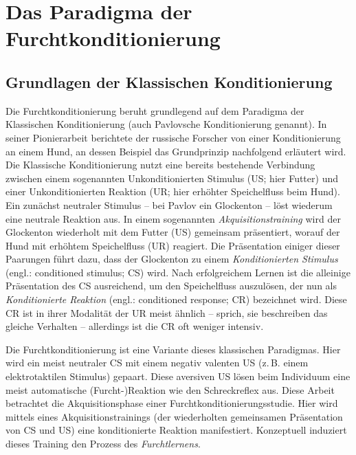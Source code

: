 
\section{Das Paradigma der Furchtkonditionierung}	\label{fearcondi}

	\subsection{Grundlagen der Klassischen Konditionierung}	\label{classic}

		Die Furchtkonditionierung beruht grundlegend auf dem Paradigma der Klassischen Konditionierung (auch Pavlovsche Konditionierung genannt). In seiner Pionierarbeit berichtete der russische Forscher \textcite{PAVLOV1927} von einer Konditionierung an einem Hund, an dessen Beispiel das Grundprinzip nachfolgend erläutert wird. 
		Die Klassische Konditionierung nutzt eine bereits bestehende Verbindung zwischen einem sogenannten Unkonditionierten Stimulus (US; hier Futter) und einer Unkonditionierten Reaktion (UR; hier erhöhter Speichelfluss beim Hund). Ein zunächst neutraler Stimulus -- bei Pavlov ein Glockenton -- löst wiederum eine neutrale Reaktion aus. In einem sogenannten \textit{Akquisitionstraining} wird der Glockenton wiederholt mit dem Futter (US) gemeinsam präsentiert, worauf der Hund mit erhöhtem Speichelfluss (UR) reagiert. Die Präsentation einiger dieser Paarungen führt dazu, dass der Glockenton zu einem \textit{Konditionierten Stimulus} (engl.: conditioned stimulus; CS) wird. Nach erfolgreichem Lernen ist die alleinige Präsentation des CS ausreichend, um den Speichelfluss auszulösen, der nun als \textit{Konditionierte Reaktion} (engl.: conditioned response; CR) bezeichnet wird. Diese CR ist in ihrer Modalität der UR meist ähnlich -- sprich, sie beschreiben das gleiche Verhalten -- allerdings ist die CR oft weniger intensiv.
		
		Die Furchtkonditionierung ist eine Variante dieses klassischen Paradigmas. Hier wird ein meist neutraler CS mit einem negativ valenten US (z.\,B. einem elektrotaktilen Stimulus) gepaart. Diese aversiven US lösen beim Individuum eine meist automatische (Furcht-)Reaktion wie den Schreckreflex aus. Diese Arbeit betrachtet die Akquisitionsphase einer Furchtkonditionierungsstudie. Hier wird mittels eines Akquisitionstrainings (der wiederholten gemeinsamen Präsentation von CS und US) eine konditionierte Reaktion manifestiert. Konzeptuell induziert dieses Training den Prozess des \textit{Furchtlernens}. 


